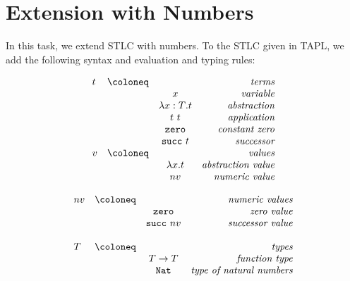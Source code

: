 \section{Extension with Numbers}
In this task, we extend STLC with numbers.
To the STLC given in TAPL, we add the following syntax and evaluation and typing rules:\\
\begin{minipage}{0.45\textwidth}
  \[ 
  \begin{array}{lccr}
    t  & \coloneq  &                  &\emph{terms}\\
    &           & {x}              &\emph{variable}\\
    &           & \lambda{x:T}.t   &\emph{abstraction}\\
    &           & {t~t}            &\emph{application}\\
    &           & \mathtt{zero}    &\emph{constant zero}\\
    &           & \mathtt{succ}~t  &\emph{successor}\\ 
    v  & \coloneq  &                  &\emph{values} \\
    &           & \lambda{x}.t     &\emph{abstraction value}\\
    &           & nv               &\emph{numeric value}\\
  \end{array}
  \]
\end{minipage}
\hfill
\begin{minipage}{0.45\textwidth}
  \[
    \begin{array}{lccr}
      nv & \coloneq  &                  &\emph{numeric values}\\
      &           & \mathtt{zero}    &\emph{zero value}\\
      &           & \mathtt{succ}~nv &\emph{successor value}\\
      \\
      T  & \coloneq  &                  &\emph{types}\\
      &           & T \rightarrow T  &\emph{function type} \\
      &           & \mathtt{Nat}     &\emph{type of natural numbers} \\
    \end{array}
  \]
\end{minipage}
\hfill
\vspace{1em}

